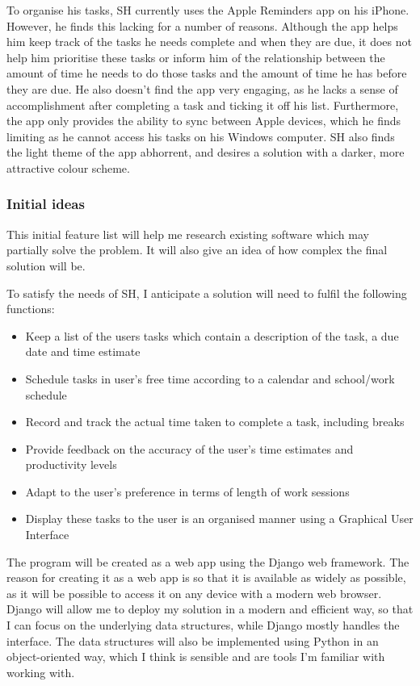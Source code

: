 \documentclass[]{article}
\begin{document}
To organise his tasks, SH currently uses the Apple Reminders app on his
iPhone. However, he finds this lacking for a number of reasons. Although
the app helps him keep track of the tasks he needs complete and when
they are due, it does not help him prioritise these tasks or inform him
of the relationship between the amount of time he needs to do those
tasks and the amount of time he has before they are due. He also doesn't
find the app very engaging, as he lacks a sense of accomplishment after
completing a task and ticking it off his list. Furthermore, the app only
provides the ability to sync between Apple devices, which he finds
limiting as he cannot access his tasks on his Windows computer. SH also
finds the light theme of the app abhorrent, and desires a solution with
a darker, more attractive colour scheme.

\hypertarget{initial-ideas}{%
\subsubsection{Initial ideas}\label{initial-ideas}}

This initial feature list will help me research existing software which
may partially solve the problem. It will also give an idea of how
complex the final solution will be.

To satisfy the needs of SH, I anticipate a solution will need to fulfil
the following functions:

\begin{itemize}
\item
  Keep a list of the users tasks which contain a description of the
  task, a due date and time estimate
\item
  Schedule tasks in user's free time according to a calendar and
  school/work schedule
\item
  Record and track the actual time taken to complete a task, including
  breaks
\item
  Provide feedback on the accuracy of the user's time estimates and
  productivity levels
\item
  Adapt to the user's preference in terms of length of work sessions
\item
  Display these tasks to the user is an organised manner using a
  Graphical User Interface
\end{itemize}

The program will be created as a web app using the Django web framework.
The reason for creating it as a web app is so that it is available as
widely as possible, as it will be possible to access it on any device
with a modern web browser. Django will allow me to deploy my solution in
a modern and efficient way, so that I can focus on the underlying data
structures, while Django mostly handles the interface. The data
structures will also be implemented using Python in an object-oriented
way, which I think is sensible and are tools I'm familiar with working
with.
\end{document}
